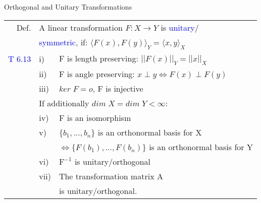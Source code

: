 \begin{mainbox}{Orthogonal and Unitary Transformations}
\setlength{\tabcolsep}{2pt}
\begin{tabular}{rll}
	Def. & \multicolumn{2}{l}{A linear transformation $F:X\rightarrow Y$ is \textcolor{blue}{unitary}/}\\
	& \multicolumn{2}{l}{\textcolor{blue}{symmetric}, if: $\langle F(x), F(y)\rangle_Y = \langle x,y\rangle_X$}\\
	\textcolor{blue}{T 6.13} & i) & F is length preserving: $||F(x)||_Y=||x||_X$\\
	& ii) & F is angle preserving: $x\perp y \Leftrightarrow F(x) \perp F(y)$\\
	& iii) & $ker\;F = {o}$, F is injective\\
	\rule{0pt}{3ex}
	& \multicolumn{2}{l}{If additionally $dim\;X = dim\;Y < \infty$:}\\
	\rule{0pt}{3ex}
	& iv) & F is an isomorphism\\
	& v) & $\{b_1, ..., b_n\}$ is an orthonormal basis for X\\
	& & $\Leftrightarrow \{F(b_1), ..., F(b_n)\}$ is an orthonormal basis for Y\\
	& vi) & $\text{F}^{-1}$ is unitary/orthogonal\\
	& vii) & The transformation matrix A\\
	& & is unitary/orthogonal.\\
\end{tabular}
\end{mainbox}